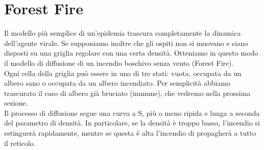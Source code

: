 \documentclass{article}
\begin{document}
    \section{Forest Fire}
    Il modello più semplice di un'epidemia trascura completamente la dinamica dell'agente virale. Se supponiamo inoltre
    che gli ospiti non si muovano e siano disposti su una griglia regolare con una certa densità.
    Otteniamo in questo modo il modello di diffusione di un incendio boschivo senza vento (Forest Fire).\\
    Ogni cella della griglia può essere in uno di tre stati: vuota, occupata da un albero sano o occupata da un albero
    incendiato. Per semplicità abbiamo trascurato il caso di albero già bruciato (immune), che vedremo nella prossima sezione.\\
    Il processo di diffusione segue una curva a S, più o meno ripida e lunga a seconda del parametro di densità.
    In particolare, se la densità è troppo bassa, l'incendio si estinguerà rapidamente, mentre se questa è alta l'incendio
    di propagherà a tutto il reticolo.
\end{document}
